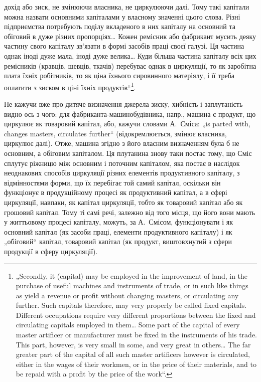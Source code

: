 \parcont{}  %
дохід або зиск, не змінюючи власника, не циркулюючи далі. Тому такі
капітали можна назвати основними капіталами у власному значенні цього
слова. Різні підприємства потребують поділу вкладеного в них капіталу
на основний та обіговий в дуже різних пропорціях\dots{} Кожен ремісник
або фабрикант мусить деяку частину свого капіталу зв’язати в формі
засобів праці своєї галузі. Ця частина однак іноді дуже мала, іноді дуже
велика\dots{} Куди більша частина капіталу всіх цих ремісників (кравців, шевців,
ткачів) перебуває однак в циркуляції, то як заробітна плата їхніх
робітників, то як ціна їхнього сировинного матеріялу, і її треба оплатити
з зиском в ціні їхніх продуктів“\footnote*{
„Secondly, it (capital) may be employed in the improvement of land, in the
purchase of useful machines and instruments of trade, or in such like things as
yield a revenue or profit without changing masters, or circulating any further. Such
capitals therefore, may very properly be called fixed capitals. Different occupations
require very different proportions between the fixed and circulating capitals employed
in them\dots{} Some part of the capital of every master artificer or manufacturer
must be fixed in the instruments of his trade. This part, however, is very small in
some, and very great in others\dots{} The far greater part of the capital of all such master
artificers however is circulated, either in the wages of their workmen, or in the
price of their materials, and to be repaid with a profit by the price of the work“.
}.

Не кажучи вже про дитяче визначення джерела зиску, хибність і заплутаність
видно ось з чого: для фабриканта-машинобудівника, напр.,
машина є продукт, що циркулює як товаровий капітал, або, кажучи словами
А.~Сміса: „is parted with, changes masters, circulates further“ (відокремлюється,
змінює власника, циркулює далі). Отже, машина згідно з
його власним визначенням була б не основним, а обіговим капіталом. Ця
плутанина знову таки постає тому, що Сміс сплутує ріжницю між основним
і поточним капіталом, яка постає в наслідок неоднакових способів
циркуляції різних елементів продуктивного капіталу, з відмінностями
форми, що їх перебігає той самий капітал, оскільки він функціонує
в продукційному процесі як продуктивний капітал, а в сфері
циркуляції, навпаки, як капітал циркуляції, тобто як товаровий капітал
або як грошовий капітал. Тому ті самі речі, залежно від того місця, що
його вони мають у життьовому процесі капіталу, можуть, за А.~Смісом,
функціонувати і як основний капітал (як засоби праці, елементи продуктивного
капіталу) і як „обіговий“ капітал, товаровий капітал (як продукт,
виштовхнутий з сфери продукції в сферу циркуляції).

